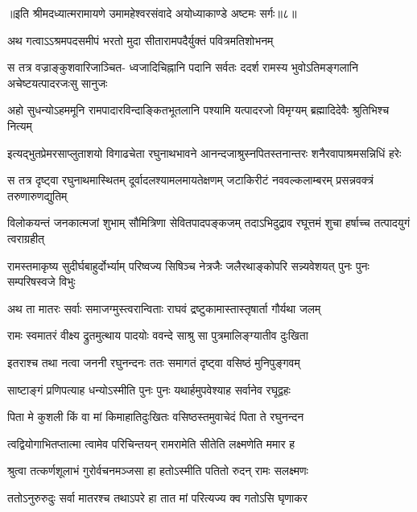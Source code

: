 {॥इति श्रीमदध्यात्मरामायणे उमामहेश्वरसंवादे
अयोध्याकाण्डे अष्टमः सर्गः॥८॥
}




\twolineshloka
{अथ गत्वाऽऽश्रमपदसमीपं भरतो मुदा}
{सीतारामपदैर्युक्तं पवित्रमतिशोभनम्} %

\fourlineindentedshloka
{स तत्र वज्राङ्कुशवारिजाञ्चित-}
{ध्वजादिचिह्नानि पदानि सर्वतः}
{ददर्श रामस्य भुवोऽतिमङ्गलानि}
{अचेष्टयत्पादरजःसु सानुजः} %

\fourlineindentedshloka
{अहो सुधन्योऽहममूनि}
{रामपादारविन्दाङ्कितभूतलानि}
{पश्यामि यत्पादरजो विमृग्यम्}
{ब्रह्मादिदेवैः श्रुतिभिश्च नित्यम्} %

\fourlineindentedshloka
{इत्यद्भुतप्रेमरसाप्लुताशयो}
{विगाढचेता रघुनाथभावने}
{आनन्दजाश्रुस्नपितस्तनान्तरः}
{शनैरवापाश्रमसन्निधिं हरेः} %

\fourlineindentedshloka
{स तत्र दृष्ट्वा रघुनाथमास्थितम्}
{दूर्वादलश्यामलमायतेक्षणम्}
{जटाकिरीटं नववल्कलाम्बरम्}
{प्रसन्नवक्त्रं तरुणारुणद्युतिम्} %

\fourlineindentedshloka
{विलोकयन्तं जनकात्मजां शुभाम्}
{सौमित्रिणा सेवितपादपङ्कजम्}
{तदाऽभिदुद्राव रघूत्तमं शुचा}
{हर्षाच्च तत्पादयुगं त्वराग्रहीत्} %

\fourlineindentedshloka
{रामस्तमाकृष्य सुदीर्घबाहुर्दोर्भ्याम्}
{परिष्वज्य सिषिञ्च नेत्रजैः}
{जलैरथाङ्कोपरि सन्न्यवेशयत्}
{पुनः पुनः सम्परिषस्वजे विभुः} %

\twolineshloka
{अथ ता मातरः सर्वाः समाजग्मुस्त्वरान्विताः}
{राघवं द्रष्टुकामास्तास्तृषार्ता गौर्यथा जलम्} %

\twolineshloka
{रामः स्वमातरं वीक्ष्य द्रुतमुत्थाय पादयोः}
{ववन्दे साश्रु सा पुत्रमालिङ्ग्यातीव दुःखिता} %

\twolineshloka
{इतराश्च तथा नत्वा जननी रघुनन्दनः}
{ततः समागतं दृष्ट्वा वसिष्ठं मुनिपुङ्गवम्} %

\twolineshloka
{साष्टाङ्गं प्रणिपत्याह धन्योऽस्मीति पुनः पुनः}
{यथार्हमुपवेश्याह सर्वानेव रघूद्वहः} %

\twolineshloka
{पिता मे कुशली किं वा मां किमाहातिदुःखितः}
{वसिष्ठस्तमुवाचेदं पिता ते रघुनन्दन} %

\twolineshloka
{त्वद्वियोगाभितप्तात्मा त्वामेव परिचिन्तयन्}
{रामरामेति सीतेति लक्ष्मणेति ममार ह} %

\twolineshloka
{श्रुत्वा तत्कर्णशूलाभं गुरोर्वचनमञ्जसा}
{हा हतोऽस्मीति पतितो रुदन् रामः सलक्ष्मणः} %

\twolineshloka
{ततोऽनुरुरुदुः सर्वा मातरश्च तथाऽपरे}
{हा तात मां परित्यज्य क्व गतोऽसि घृणाकर} %

